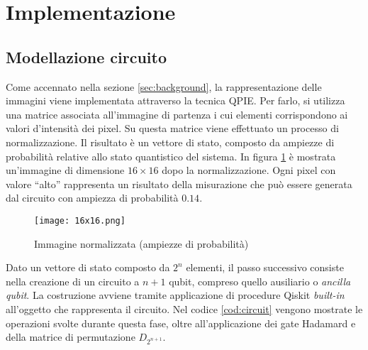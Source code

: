\section{Implementazione}\label{sec:implementazione}

\subsection{Modellazione circuito}
Come accennato nella sezione \ref{sec:background}, la rappresentazione 
delle immagini viene implementata attraverso la tecnica QPIE. 
Per farlo, si utilizza una matrice associata all'immagine di partenza
i cui elementi corrispondono ai valori d'intensità dei pixel.
Su questa matrice viene effettuato un processo di normalizzazione.
Il risultato è un vettore di stato, composto da ampiezze di
probabilità relative allo stato quantistico del sistema. 
In figura \ref{fig:16x16intensity_img} è mostrata un'immagine di 
dimensione $16 \times 16$ dopo la normalizzazione. Ogni pixel 
con valore ``alto'' rappresenta un risultato della misurazione 
che può essere generata dal circuito con ampiezza di probabilità $0.14$.

\begin{figure}
    \centering
    \texttt{[image: 16x16.png]}
    \caption{Immagine normalizzata (ampiezze di probabilità)}
    \label{fig:16x16intensity_img}
\end{figure}

Dato un vettore di stato composto da $2^n$ elementi, 
il passo successivo consiste nella creazione di un circuito a $n+1$ qubit, 
compreso quello ausiliario o \textit{ancilla qubit}.
La costruzione avviene tramite applicazione di procedure Qiskit \textit{built-in} 
all'oggetto che rappresenta il circuito.
Nel codice \ref{cod:circuit} vengono mostrate le operazioni svolte durante
questa fase, oltre all'applicazione dei gate Hadamard e della matrice 
di permutazione $D_{2^{n+1}}$.

